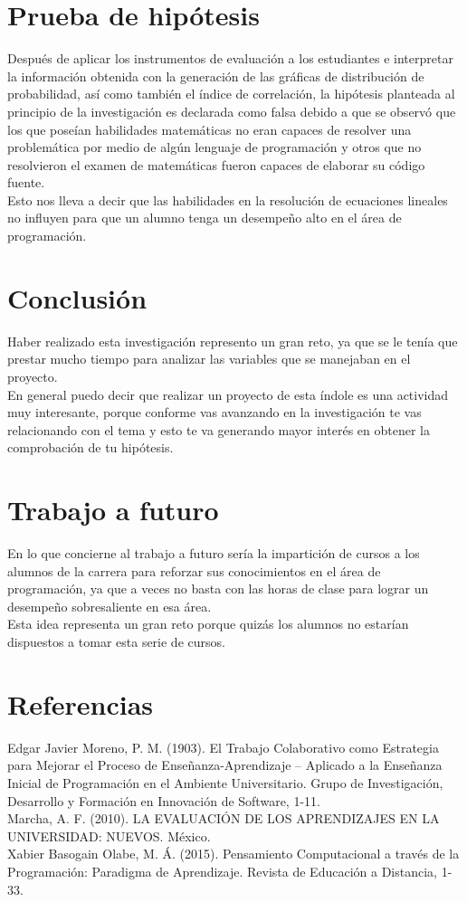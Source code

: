 \documentclass[12pt] {report}
\begin{document}
\section{Prueba de hipótesis}
Después de aplicar los instrumentos de evaluación a los estudiantes e interpretar la información obtenida con la generación de las gráficas de distribución de probabilidad, así como también el índice de correlación, la hipótesis planteada al principio de la investigación es declarada como falsa debido a que se observó que los que poseían habilidades matemáticas no eran capaces de resolver una problemática por medio de algún lenguaje de programación y otros que no resolvieron el examen de matemáticas fueron capaces de elaborar su código fuente.\\
Esto nos lleva a decir que las habilidades en la resolución de ecuaciones lineales no influyen para que un alumno tenga un desempeño alto en el área de programación.\\

\section{Conclusión}
Haber realizado esta investigación represento un gran reto, ya que se le tenía que prestar mucho tiempo para analizar las variables que se manejaban en el proyecto.\\
En general puedo decir que realizar un proyecto de esta índole es una actividad muy interesante, porque conforme vas avanzando en la investigación te vas relacionando con el tema y esto te va generando mayor interés en obtener la comprobación de tu hipótesis.\\  
\section{Trabajo a futuro}
En lo que concierne al trabajo a futuro sería la impartición de cursos a los alumnos de la carrera para reforzar sus conocimientos en el área de programación, ya que a veces no basta con las horas de clase para lograr un desempeño sobresaliente en esa área.\\
Esta idea representa un gran reto porque quizás los alumnos no estarían dispuestos a tomar esta serie de cursos.\\

 \section{Referencias}
Edgar Javier Moreno, P. M. (1903). El Trabajo Colaborativo como Estrategia para Mejorar el Proceso de Enseñanza-Aprendizaje – Aplicado a la Enseñanza Inicial de Programación en el Ambiente Universitario. Grupo de Investigación, Desarrollo y Formación en Innovación de Software, 1-11.\\
Marcha, A. F. (2010). LA EVALUACIÓN DE LOS APRENDIZAJES EN LA UNIVERSIDAD: NUEVOS. México.\\
Xabier Basogain Olabe, M. Á. (2015). Pensamiento Computacional a través de la Programación: Paradigma de Aprendizaje. Revista de Educación a Distancia, 1-33.\\
\end{document}
